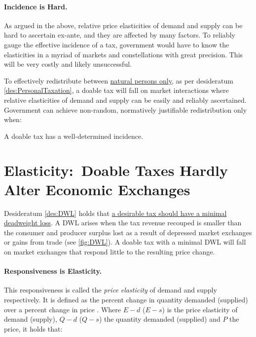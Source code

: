 \paragraph{Incidence is Hard.} As argued in the above, relative price elasticities of demand and supply can be hard to ascertain ex-ante, and they are affected by many factors.
To reliably gauge the effective incidence of a tax, government would have to know the elasticities in a myriad of markets and constellations with great precision.
This will be very costly and likely unsuccessful.


To effectively redistribute between \href{des:PersonalTaxation}{natural persons only}, as per desideratum \ref{des:PersonalTaxation}, a doable tax will fall on market interactions where relative elasticities of demand and supply can be easily and reliably ascertained.
Government can achieve non-random, normatively justifiable redistribution only when:

\begin{desideratum}
	A doable tax has a well-determined incidence.
	\label{des:TaxIncidence}
\end{desideratum}

\section[Elasticity]{Elasticity:~Doable Taxes Hardly Alter Economic Exchanges} \label{sec:tax-elasticity} %
Desideratum \ref{des:DWL} holds that \href{des:DWL}{a desirable tax should have a minimal deadweight loss}.
A DWL arises when the tax revenue recouped is smaller than the consumer and producer surplus lost as a result of depressed market exchanges or gains from trade (see \autoref{fig:DWL}).
A doable tax with a minimal DWL will fall on market exchanges that respond little to the resulting price change.

\paragraph{Responsiveness is Elasticity.} This responsiveness is called the \emph{price elasticity} of demand and supply respectively.
It is defined as the percent change in quantity demanded (supplied) over a percent change in price \citep{Marshall1890}.
Where $E-{d}$ ($E-{s}$)  is the price elasticity of demand (supply), $Q-{d}$ ($Q-{s}$) the quantity demanded (supplied) and $P$ the price, it holds that:

